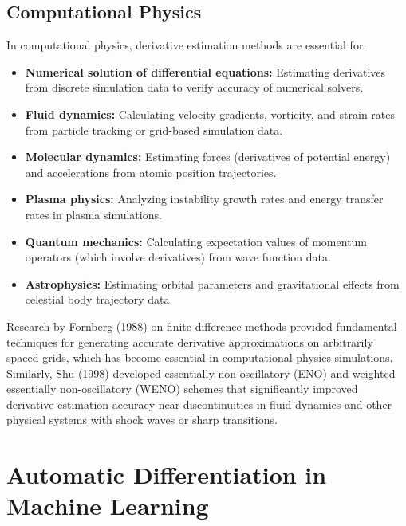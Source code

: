 \documentclass{article}
\begin{document}
\subsection{Computational Physics}

In computational physics, derivative estimation methods are essential for:

\begin{itemize}
    \item \textbf{Numerical solution of differential equations:} Estimating derivatives from discrete simulation data to verify accuracy of numerical solvers.
    
    \item \textbf{Fluid dynamics:} Calculating velocity gradients, vorticity, and strain rates from particle tracking or grid-based simulation data.
    
    \item \textbf{Molecular dynamics:} Estimating forces (derivatives of potential energy) and accelerations from atomic position trajectories.
    
    \item \textbf{Plasma physics:} Analyzing instability growth rates and energy transfer rates in plasma simulations.
    
    \item \textbf{Quantum mechanics:} Calculating expectation values of momentum operators (which involve derivatives) from wave function data.
    
    \item \textbf{Astrophysics:} Estimating orbital parameters and gravitational effects from celestial body trajectory data.
\end{itemize}

Research by Fornberg (1988) on finite difference methods provided fundamental techniques for generating accurate derivative approximations on arbitrarily spaced grids, which has become essential in computational physics simulations. Similarly, Shu (1998) developed essentially non-oscillatory (ENO) and weighted essentially non-oscillatory (WENO) schemes that significantly improved derivative estimation accuracy near discontinuities in fluid dynamics and other physical systems with shock waves or sharp transitions.

\section{Automatic Differentiation in Machine Learning}
\end{document}
